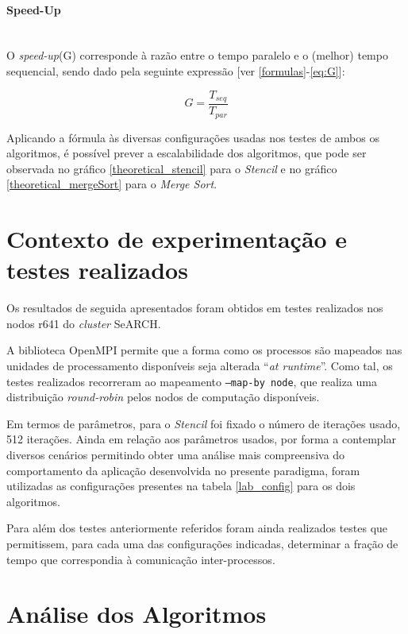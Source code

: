 \documentclass{article}
\begin{document}
\paragraph{Speed-Up}\mbox{}\\

O \textit{speed-up}(G) corresponde à razão entre o tempo paralelo e o (melhor) tempo sequencial,
sendo dado pela seguinte expressão [ver \ref{formulas}-\ref{eq:G}]:

$$G=\frac{T_{seq}}{T_{par}}$$

Aplicando a fórmula às diversas configurações usadas nos testes de ambos os algoritmos, é possível prever a escalabilidade dos algoritmos, que pode ser observada no gráfico \ref{theoretical_stencil} para o \textit{Stencil} e no gráfico \ref{theoretical_mergeSort} para o \textit{Merge Sort}.

\section{Contexto de experimentação e testes realizados} \label{context}

Os resultados de seguida apresentados foram obtidos em testes realizados nos nodos r641 do \textit{cluster} SeARCH.

A biblioteca OpenMPI permite que a forma como os processos são mapeados nas unidades de processamento disponíveis seja alterada ``\textit{at runtime}''. Como tal, os testes realizados recorreram ao mapeamento \texttt{--map-by node}, que realiza uma distribuição \textit{round-robin} pelos nodos de computação disponíveis.

Em termos de parâmetros, para o \textit{Stencil} foi fixado o número de iterações usado, 512 iterações.
Ainda em relação aos parâmetros usados, por forma a contemplar diversos cenários
permitindo obter uma análise mais compreensiva do comportamento da aplicação desenvolvida no
presente paradigma, foram utilizadas as configurações presentes na tabela \ref{lab_config} para os dois algoritmos.

Para além dos testes anteriormente referidos foram ainda realizados testes que permitissem, para cada uma das 
configurações indicadas, determinar a fração de tempo que correspondia à comunicação inter-processos.

\section{Análise dos Algoritmos} \label{comp}
\end{document}
